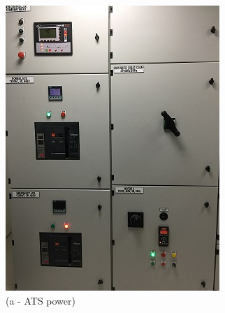 \begin{figure}
	\begin{minipage}[b]{0.22\linewidth}
		\centering
		\includegraphics[width=\textwidth]{figures/R1P_visual/atspower}
		\caption*{(a - ATS power)}
	\end{minipage}
	\hspace{0.03cm}
	\begin{minipage}[b]{0.22\linewidth}
		\centering

\end{minipage}
\end{figure}
